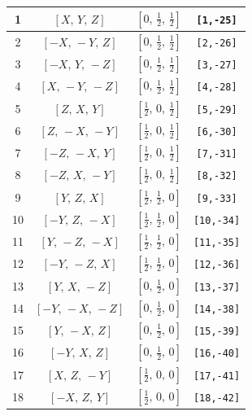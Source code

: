 \documentclass[fleqn,8pt]{jsarticle}
\begin{document}
\begin{longtable}{cccc}
1 & $\left[ X,\, Y,\, Z \right]$ & $\left[ 0,\, \frac{1}{2},\, \frac{1}{2} \right]$ & {\tt [1,-25]} \\ \hline
2 & $\left[ - X,\, - Y,\, Z \right]$ & $\left[ 0,\, \frac{1}{2},\, \frac{1}{2} \right]$ & {\tt [2,-26]} \\ \hline
3 & $\left[ - X,\, Y,\, - Z \right]$ & $\left[ 0,\, \frac{1}{2},\, \frac{1}{2} \right]$ & {\tt [3,-27]} \\ \hline
4 & $\left[ X,\, - Y,\, - Z \right]$ & $\left[ 0,\, \frac{1}{2},\, \frac{1}{2} \right]$ & {\tt [4,-28]} \\ \hline
5 & $\left[ Z,\, X,\, Y \right]$ & $\left[ \frac{1}{2},\, 0,\, \frac{1}{2} \right]$ & {\tt [5,-29]} \\ \hline
6 & $\left[ Z,\, - X,\, - Y \right]$ & $\left[ \frac{1}{2},\, 0,\, \frac{1}{2} \right]$ & {\tt [6,-30]} \\ \hline
7 & $\left[ - Z,\, - X,\, Y \right]$ & $\left[ \frac{1}{2},\, 0,\, \frac{1}{2} \right]$ & {\tt [7,-31]} \\ \hline
8 & $\left[ - Z,\, X,\, - Y \right]$ & $\left[ \frac{1}{2},\, 0,\, \frac{1}{2} \right]$ & {\tt [8,-32]} \\ \hline
9 & $\left[ Y,\, Z,\, X \right]$ & $\left[ \frac{1}{2},\, \frac{1}{2},\, 0 \right]$ & {\tt [9,-33]} \\ \hline
10 & $\left[ - Y,\, Z,\, - X \right]$ & $\left[ \frac{1}{2},\, \frac{1}{2},\, 0 \right]$ & {\tt [10,-34]} \\ \hline
11 & $\left[ Y,\, - Z,\, - X \right]$ & $\left[ \frac{1}{2},\, \frac{1}{2},\, 0 \right]$ & {\tt [11,-35]} \\ \hline
12 & $\left[ - Y,\, - Z,\, X \right]$ & $\left[ \frac{1}{2},\, \frac{1}{2},\, 0 \right]$ & {\tt [12,-36]} \\ \hline
13 & $\left[ Y,\, X,\, - Z \right]$ & $\left[ 0,\, \frac{1}{2},\, 0 \right]$ & {\tt [13,-37]} \\ \hline
14 & $\left[ - Y,\, - X,\, - Z \right]$ & $\left[ 0,\, \frac{1}{2},\, 0 \right]$ & {\tt [14,-38]} \\ \hline
15 & $\left[ Y,\, - X,\, Z \right]$ & $\left[ 0,\, \frac{1}{2},\, 0 \right]$ & {\tt [15,-39]} \\ \hline
16 & $\left[ - Y,\, X,\, Z \right]$ & $\left[ 0,\, \frac{1}{2},\, 0 \right]$ & {\tt [16,-40]} \\ \hline
17 & $\left[ X,\, Z,\, - Y \right]$ & $\left[ \frac{1}{2},\, 0,\, 0 \right]$ & {\tt [17,-41]} \\ \hline
18 & $\left[ - X,\, Z,\, Y \right]$ & $\left[ \frac{1}{2},\, 0,\, 0 \right]$ & {\tt [18,-42]} \\ \hline

\end{longtable}
\end{document}
